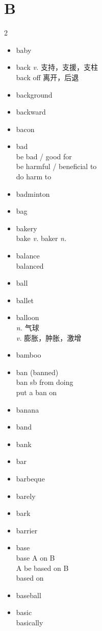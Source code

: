 \documentclass[../../book.tex]{subfiles}
\begin{document}
\section{B}
\raggedcolumns
\begin{multicols}{2}
\begin{itemize}
\item[-] baby
\item[-] back \emph{v.} 支持，支援，支柱
\\back off 离开，后退
\item[-] background
\item[-] backward
\item[-] bacon
\item[-] bad
\\be bad / good for
\\be harmful / beneficial to
\\do harm to
\item[-] badminton
\item[-] bag
\item[-] bakery
\\bake \emph{v.} baker \emph{n.}
\item[-] balance
\\balanced
\item[-] ball
\item[-] ballet
\item[-] balloon
\\\emph{n.} 气球
\\\emph{v.} 膨胀，肿胀，激增
\item[-] bamboo
\item[-] ban (banned)
\\ban sb from doing
\\put a ban on
\item[-] banana
\item[-] band
\item[-] bank
\item[-] bar
\item[-] barbeque
\item[-] barely
\item[-] bark
\item[-] barrier
\item[-] base
\\base A on B
\\A be based on B
\\based on
\item[-] baseball
\item[-] basic
\\basically

\end{itemize}
\end{multicols}
\end{document}
